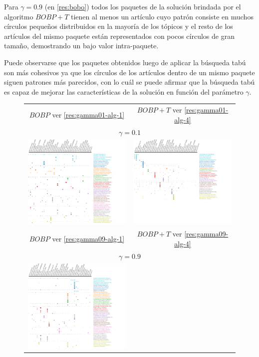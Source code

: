 Para $\gamma=0.9$ (en \autoref{res:bobo}) todos los paquetes de la solución brindada por el algoritmo $BOBP+T$ tienen al menos un artículo cuyo patrón consiste en muchos círculos pequeños distribuidos en la mayoría de los tópicos y el resto de los artículos del mismo paquete están representados con pocos círculos de gran tamaño, demostrando un bajo valor intra-paquete.

Puede observarse que los paquetes obtenidos luego de aplicar la búsqueda tabú son más cohesivos ya que los círculos de los artículos dentro de un mismo paquete siguen patrones más parecidos, con lo cuál se puede afirmar que la búsqueda tabú es capaz de mejorar las características de la solución en función del parámetro $\gamma$. 

\begin{figure}[H]
	\centering
	\begin{tabular}{cc}
		$BOBP$ ver \autoref{res:gamma01-alg-1} & $BOBP+T$ ver \autoref{res:gamma01-alg-4} \\
		\multicolumn{2}{c}{$\gamma=0.1$}\\
		\includegraphics[width=0.45\linewidth]{img/gamma-01-alg-3.png}&
		\includegraphics[width=0.45\linewidth]{img/gamma-01-alg-4.png}\vspace{1cm}\\
		$BOBP$ ver \autoref{res:gamma09-alg-1} & $BOBP+T$ ver \autoref{res:gamma09-alg-4} \\
		\multicolumn{2}{c}{$\gamma=0.9$}\\
		\includegraphics[width=0.45\linewidth]{img/gamma-09-alg-3.png}&

\end{tabular}
\end{figure}
